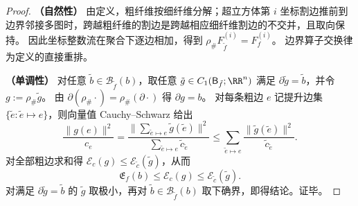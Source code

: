 \begin{proof}
\textbf{（自然性）}
由定义，粗纤维按细纤维分解；超立方体第 \(i\) 坐标割边推前到边界邻接多图时，跨越粗纤维的割边是跨越相应细纤维割边的不交并，且取向保持。
因此坐标整数流在聚合下逐边相加，得到 \(\rho_\#F^{(i)}_{\tilde f}=F^{(i)}_{f}\)。
边界算子交换律为定义的直接重排。
\par
\textbf{（单调性）}
对任意 \(\tilde b\in\mathcal B_{\tilde f}(b)\)，取任意 \(\tilde g\in C_1(\mathsf B_{\tilde f};\RR^n)\) 满足 \(\partial\tilde g=\tilde b\)，并令 \(g:=\rho_\#\tilde g\)。
由 \(\partial(\rho_\#\cdot)=\rho_\#(\partial\cdot)\) 得 \(\partial g=b\)。
对每条粗边 \(e\) 记提升边集 \(\{\tilde e:\tilde e\mapsto e\}\)，则向量值 Cauchy--Schwarz 给出
\[
\frac{\|g(e)\|^2}{c_e}
=\frac{\bigl\|\sum_{\tilde e\mapsto e}\tilde g(\tilde e)\bigr\|^2}{\sum_{\tilde e\mapsto e}\tilde c_{\tilde e}}
\le
\sum_{\tilde e\mapsto e}\frac{\|\tilde g(\tilde e)\|^2}{\tilde c_{\tilde e}}.
\]
对全部粗边求和得 \(\mathcal E_c(g)\le \mathcal E_{\tilde c}(\tilde g)\)，从而
\[
\mathfrak E_f(b)\le \mathcal E_c(g)\le \mathcal E_{\tilde c}(\tilde g).
\]
对满足 \(\partial\tilde g=\tilde b\) 的 \(\tilde g\) 取极小，再对 \(\tilde b\in\mathcal B_{\tilde f}(b)\) 取下确界，即得结论。证毕。
\end{proof}

\endinput
